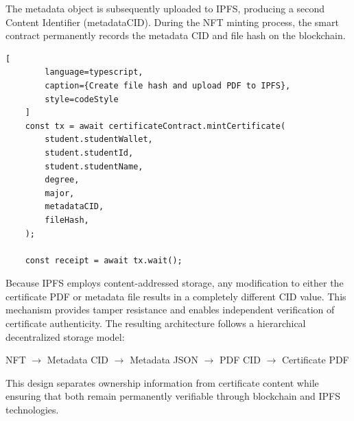 The metadata object is subsequently uploaded to IPFS, producing a second Content Identifier (metadataCID). During the NFT minting process, the smart contract permanently records the metadata CID and file hash on the blockchain.

\begin{lstlisting}[
        language=typescript, 
        caption={Create file hash and upload PDF to IPFS},
        style=codeStyle
    ]
    const tx = await certificateContract.mintCertificate(
        student.studentWallet,
        student.studentId,
        student.studentName,
        degree,
        major,
        metadataCID,
        fileHash,
    );

    const receipt = await tx.wait();
\end{lstlisting}

Because IPFS employs content-addressed storage, any modification to either the certificate PDF or metadata file results in a completely different CID value. This mechanism provides tamper resistance and enables independent verification of certificate authenticity. The resulting architecture follows a hierarchical decentralized storage model:

\begin{center}
    NFT
    $\rightarrow$
    Metadata CID
    $\rightarrow$
    Metadata JSON
    $\rightarrow$
    PDF CID
    $\rightarrow$
    Certificate PDF
\end{center}

This design separates ownership information from certificate content while ensuring that both remain permanently verifiable through blockchain and IPFS technologies.